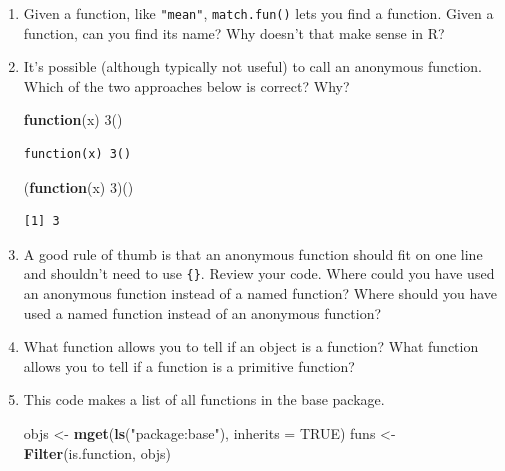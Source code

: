 \documentclass[]{book}
\newenvironment{Shaded}{\begin{snugshade}}{\end{snugshade}}
\newcommand{\ControlFlowTok}[1]{\textcolor[rgb]{0.13,0.29,0.53}{\textbf{#1}}}
\newcommand{\DataTypeTok}[1]{\textcolor[rgb]{0.13,0.29,0.53}{#1}}
\newcommand{\DecValTok}[1]{\textcolor[rgb]{0.00,0.00,0.81}{#1}}
\newcommand{\KeywordTok}[1]{\textcolor[rgb]{0.13,0.29,0.53}{\textbf{#1}}}
\newcommand{\NormalTok}[1]{#1}
\newcommand{\OtherTok}[1]{\textcolor[rgb]{0.56,0.35,0.01}{#1}}
\newcommand{\StringTok}[1]{\textcolor[rgb]{0.31,0.60,0.02}{#1}}
\theoremstyle{definition}
\theoremstyle{definition}
\theoremstyle{definition}
\theoremstyle{remark}
\begin{document}
\begin{enumerate}
\def\labelenumi{\arabic{enumi}.}
\item
  Given a function, like \texttt{"mean"}, \texttt{match.fun()} lets you
  find a function. Given a function, can you find its name? Why doesn't
  that make sense in R?
\item
  It's possible (although typically not useful) to call an anonymous
  function. Which of the two approaches below is correct? Why?

\begin{Shaded}
\begin{Highlighting}[]
\ControlFlowTok{function}\NormalTok{(x) }\DecValTok{3}\NormalTok{()}
\end{Highlighting}
\end{Shaded}

\begin{verbatim}
function(x) 3()
\end{verbatim}

\begin{Shaded}
\begin{Highlighting}[]
\NormalTok{(}\ControlFlowTok{function}\NormalTok{(x) }\DecValTok{3}\NormalTok{)()}
\end{Highlighting}
\end{Shaded}

\begin{verbatim}
[1] 3
\end{verbatim}
\item
  A good rule of thumb is that an anonymous function should fit on one
  line and shouldn't need to use \texttt{\{\}}. Review your code. Where
  could you have used an anonymous function instead of a named function?
  Where should you have used a named function instead of an anonymous
  function?
\item
  What function allows you to tell if an object is a function? What
  function allows you to tell if a function is a primitive function?
\item
  This code makes a list of all functions in the base package.

\begin{Shaded}
\begin{Highlighting}[]
\NormalTok{objs <-}\StringTok{ }\KeywordTok{mget}\NormalTok{(}\KeywordTok{ls}\NormalTok{(}\StringTok{"package:base"}\NormalTok{), }\DataTypeTok{inherits =} \OtherTok{TRUE}\NormalTok{)}
\NormalTok{funs <-}\StringTok{ }\KeywordTok{Filter}\NormalTok{(is.function, objs)}
\end{Highlighting}
\end{Shaded}


\end{enumerate}
\end{document}

